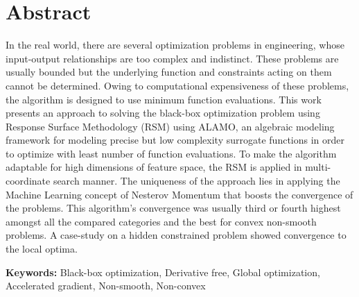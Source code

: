 \chapter{Abstract}
In the real world, there are several optimization problems in engineering, whose input-output relationships are too complex and indistinct. These problems are usually bounded but the underlying function and constraints acting on them cannot be determined. Owing to computational expensiveness of these problems, the algorithm is designed to use minimum function evaluations. This work presents an approach to solving the black-box optimization problem using Response Surface Methodology (RSM) using ALAMO, an algebraic modeling framework for modeling precise but low complexity surrogate functions in order to optimize with least number of function evaluations. To make the algorithm adaptable for high dimensions of feature space, the RSM is applied in multi-coordinate search manner. The uniqueness of the approach lies in applying the Machine Learning concept of Nesterov Momentum that boosts the convergence of the problems. This algorithm's convergence was usually third or fourth highest amongst all the compared categories and the best for convex non-smooth problems. A case-study on a hidden constrained problem showed convergence to the local optima.

\noindent
\textbf{Keywords:} Black-box optimization, Derivative free, Global optimization, Accelerated gradient, Non-smooth, Non-convex

